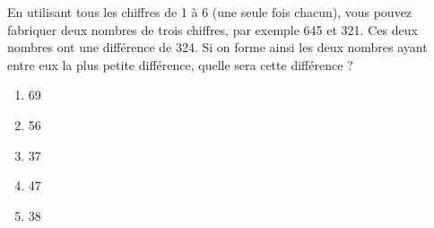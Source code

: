 En utilisant tous les chiffres de 1 à 6 (une seule fois chacun), vous pouvez fabriquer deux nombres de trois chiffres, par exemple 645 et 321. Ces deux nombres ont une différence de 324. Si on forme ainsi les deux nombres ayant entre eux la plus petite différence, quelle sera cette différence ?
\begin{multicols}{5}
  \begin{enumerate}[A/]
  \item 69
  \item 56
  \item 37
  \item 47
  \item 38
  \end{enumerate}
\end{multicols}